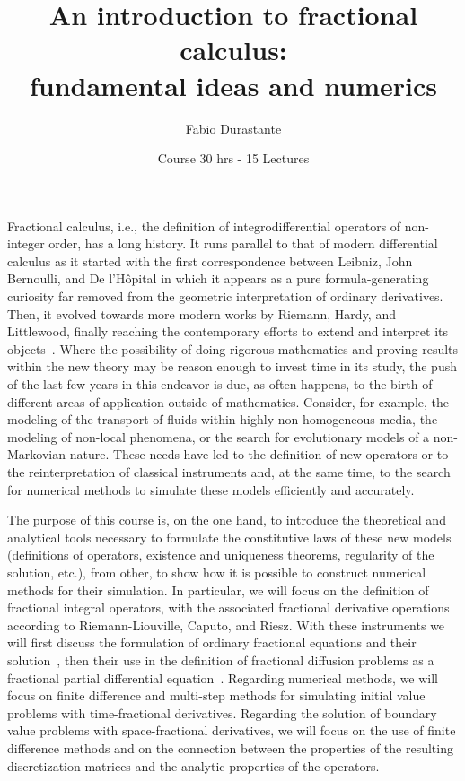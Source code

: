\documentclass[a4paper]{article}
\title{An introduction to fractional calculus:\\fundamental ideas and numerics}
\author[1]{Fabio Durastante}
\affil[1]{Università di Pisa, Dipartimento di Matematica, \href{mailto:fabio.durastante@unipi.it}{fabio.durastante@unipi.it}}
\date{Course 30 hrs - 15 Lectures}
\begin{document}
	
\maketitle	
	
Fractional calculus, i.e., the definition of integrodifferential operators of
non-integer order, has a long history. It runs parallel to that of modern
differential calculus as it started with the first correspondence between Leibniz, John
Bernoulli, and De l'Hôpital in which it appears as a pure formula-generating 
curiosity far removed from the geometric
interpretation of ordinary derivatives. Then, it evolved towards more modern works by Riemann,
Hardy, and Littlewood, finally reaching the contemporary efforts to extend and interpret its
objects~\cite{MillerRoss,MR0361633}. Where the possibility of doing rigorous mathematics and proving results
within the new theory may be reason enough to invest time in its study, the push
of the last few years in this endeavor is due, as often happens, to the birth of
different areas of application outside of mathematics. Consider, for example,
the modeling of the transport of fluids within highly non-homogeneous media, the
modeling of non-local phenomena, or the search for evolutionary models of a 
non-Markovian nature. These needs have led to the definition of new operators or to
the reinterpretation of classical instruments and, at the same time, to the
search for numerical methods to simulate these models efficiently and accurately.

The purpose of this course is, on the one hand, to introduce the theoretical and
analytical tools necessary to formulate the constitutive laws of these new models
(definitions of operators, existence and uniqueness theorems, regularity of the
solution, etc.), from other, to show how it is possible to construct numerical
methods for their simulation. In particular, we will focus on the definition of
fractional integral operators, with the associated fractional derivative
operations according to Riemann-Liouville, Caputo, and Riesz. With these
instruments we will first discuss the formulation of ordinary fractional
equations and their solution~\cite{DiethelmBook}, then their use in the
definition of fractional diffusion problems as a fractional partial differential
equation~\cite{PodlubnyBook}. Regarding numerical methods, we will focus on finite 
difference and multi-step methods for simulating initial value problems with time-fractional
derivatives. Regarding the solution of boundary value problems with space-fractional derivatives, 
we will focus on the use of finite difference methods and on the connection between 
the properties of the resulting discretization matrices and the analytic 
properties of the operators.
\end{document}
